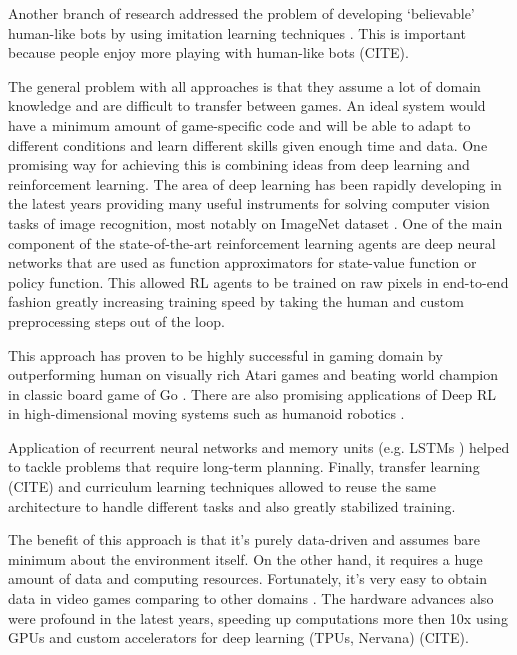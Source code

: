 Another branch of research addressed the problem of developing `believable' human-like bots \cite{BelievableBots} by using imitation learning techniques \cite{UT2}. This is important because people enjoy more playing with human-like bots (CITE).


The general problem with all approaches is that they assume a lot of domain knowledge and are difficult to transfer between games. An ideal system would have a minimum amount of game-specific code and will be able to adapt to different conditions and learn different skills given enough time and data.
One promising way for achieving this is combining ideas from deep learning and reinforcement learning.
The area of deep learning has been rapidly developing in the latest years providing many useful
instruments for solving computer vision tasks of image recognition, most notably on ImageNet dataset \cite{AlexNet}. 
One of the main component of the state-of-the-art reinforcement learning agents are deep neural networks that are used as function approximators for state-value function or policy function.
This allowed RL agents to be trained on raw pixels in end-to-end fashion greatly increasing training speed by taking the human and custom preprocessing steps out of the loop.

This approach has proven to be highly successful in gaming domain by outperforming human on visually rich Atari games \cite{Atari} and beating world champion in classic board game of Go \cite{AlphaGo}.
There are also promising applications of Deep RL in high-dimensional moving systems such as humanoid robotics \cite{Robotics}.

Application of recurrent neural networks\cite{RLRNN} and memory units (e.g. LSTMs \cite{TextGamesLSTM}) helped to tackle problems that require long-term planning.
Finally, transfer learning (CITE) and curriculum learning \cite{Curriculum} techniques allowed to reuse the same architecture to handle different tasks and also greatly stabilized training.

The benefit of this approach is that it's purely data-driven and assumes bare minimum about the environment itself. On the other hand, it requires a huge amount of data and computing resources.
Fortunately, it's very easy to obtain data in video games comparing to other domains \cite{TrainInGames}. The hardware advances also were profound in the latest years, speeding up computations more then 10x using GPUs and custom accelerators for deep learning (TPUs, Nervana) (CITE).


